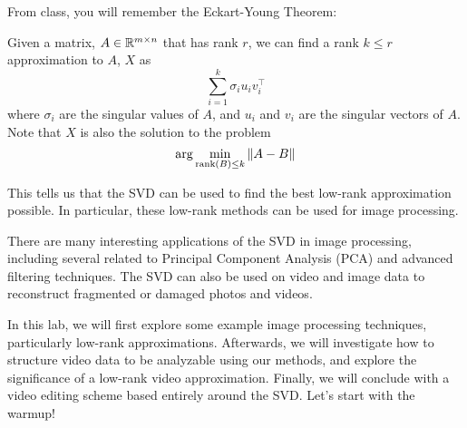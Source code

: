 From class, you will remember the Eckart-Young Theorem\cite{Eckart1936}:

\begin{theorem}
	Given a matrix, $A \in \mathbb{R}^{m \times n}$ that has rank $r$, we can find a rank $k \leq r$ approximation to $A$, $X$ as
	$$\sum_{i = 1}^k \sigma_i u_i v_i^\top$$
	where $\sigma_i$ are the singular values of $A$, and $u_i$ and $v_i$ are the singular vectors of $A$. Note that $X$ is also the solution to the problem
	$$\arg \min_{\mathrm{rank}\left(B\right) \leq k} \|A - B\|$$
	\label{thm:eckart-young}
\end{theorem}

This tells us that the SVD can be used to find the best low-rank approximation possible. In particular, these low-rank methods can be used for image processing. 

There are many interesting applications of the SVD in image processing, including several related to Principal Component Analysis (PCA) and advanced filtering techniques.\cite{1162766}\cite{1326538}\cite{382496} The SVD can also be used on video and image data to reconstruct fragmented or damaged photos and videos.\cite{VideoRest}

In this lab, we will first explore some example image processing techniques, particularly low-rank approximations. Afterwards, we will investigate how to structure video data to be analyzable using our methods, and explore the significance of a low-rank video approximation. Finally, we will conclude with a video editing scheme based entirely around the SVD. Let's start with the warmup!